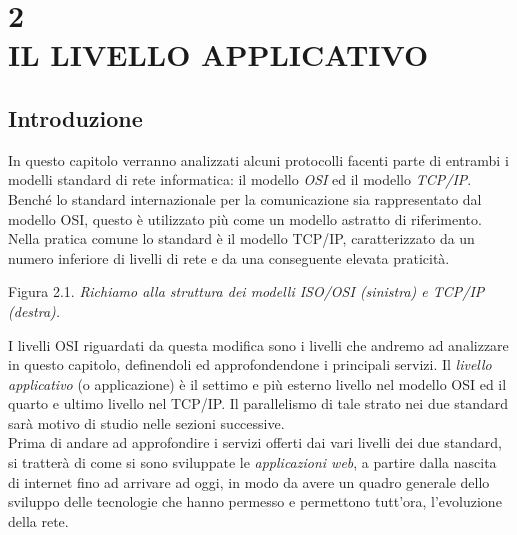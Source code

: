 \documentclass[a4paper, 11pt, oneside]{book}
\theoremstyle{plain}
\newlength\Textwd
\newcommand\Textbox[2]{%
  \parbox[c][#1][c]{\Textwd}{\centering#2}}
\begin{document}
\chapter*{2\\IL LIVELLO APPLICATIVO} 

\section*{Introduzione}

In questo capitolo verranno analizzati alcuni protocolli facenti parte di entrambi i modelli standard di rete informatica: il modello \textit{OSI} ed il modello\textit{ TCP/IP}. \\
Benché lo standard internazionale per la comunicazione sia rappresentato dal modello OSI, questo è utilizzato più come un modello astratto di riferimento. Nella pratica comune lo standard è il modello TCP/IP, caratterizzato da un numero inferiore di livelli di rete e da una conseguente elevata praticità. 

\begin{center}
\end{center}
\begin{center}
 Figura 2.1. \textit{Richiamo alla struttura dei modelli ISO/OSI (sinistra) e TCP/IP (destra).}
\end{center}


I livelli OSI riguardati da questa modifica sono i livelli che andremo ad analizzare in questo capitolo, definendoli ed approfondendone i principali servizi. Il \textit{livello applicativo} (o applicazione) è il settimo e più esterno livello nel modello OSI ed il quarto e ultimo livello nel TCP/IP. Il parallelismo di tale strato nei due standard sarà motivo di studio nelle sezioni successive.\\
Prima di andare ad approfondire i servizi offerti dai vari livelli dei due standard, si tratterà di come si sono sviluppate le \textit{applicazioni web}, a partire dalla nascita di internet fino ad arrivare ad oggi, in modo da avere un quadro generale dello sviluppo delle tecnologie che hanno permesso e permettono tutt'ora, l'evoluzione della rete.
\end{document}
